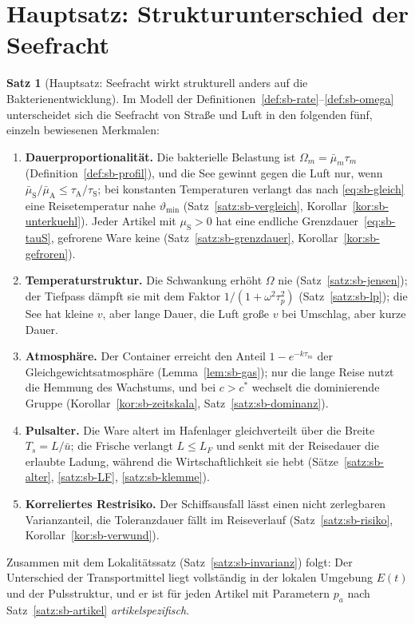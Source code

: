 \documentclass[a4paper, 12pt, twoside, openright]{report}
\theoremstyle{definition}
\theoremstyle{definition}
\newtheorem{satz}{Satz}[chapter]
\begin{document}
\section{Hauptsatz: Strukturunterschied der Seefracht}
\label{sec:sb-haupt}

\begin{satz}[Hauptsatz: Seefracht wirkt strukturell anders auf die Bakterienentwicklung]\label{satz:sb-haupt}
Im Modell der Definitionen~\ref{def:sb-rate}--\ref{def:sb-omega} unterscheidet sich die
Seefracht von Straße und Luft in den folgenden fünf, einzeln bewiesenen Merkmalen:
\begin{enumerate}
  \item \textbf{Dauerproportionalität.} Die bakterielle Belastung ist $\Omega_m=\bar\mu_m\tau_m$
    (Definition~\ref{def:sb-profil}), und die See gewinnt gegen die Luft nur, wenn
    $\bar\mu_{\mathrm S}/\bar\mu_{\mathrm A}\le\tau_{\mathrm A}/\tau_{\mathrm S}$; bei konstanten
    Temperaturen verlangt das nach \eqref{eq:sb-gleich} eine Reisetemperatur nahe $\vartheta_{\min}$
    (Satz~\ref{satz:sb-vergleich}, Korollar~\ref{kor:sb-unterkuehl}). Jeder Artikel mit $\mu_{\mathrm S}>0$
    hat eine endliche Grenzdauer~\eqref{eq:sb-tauS}, gefrorene Ware keine
    (Satz~\ref{satz:sb-grenzdauer}, Korollar~\ref{kor:sb-gefroren}).
  \item \textbf{Temperaturstruktur.} Die Schwankung erhöht $\Omega$ nie (Satz~\ref{satz:sb-jensen});
    der Tiefpass dämpft sie mit dem Faktor $1/(1+\omega^2\tau_p^2)$ (Satz~\ref{satz:sb-lp}); die See
    hat kleine $v$, aber lange Dauer, die Luft große $v$ bei Umschlag, aber kurze Dauer.
  \item \textbf{Atmosphäre.} Der Container erreicht den Anteil $1-e^{-k\tau_m}$ der
    Gleichgewichtsatmosphäre (Lemma~\ref{lem:sb-gas}); nur die lange Reise nutzt die Hemmung
    des Wachstums, und bei $c>c^\ast$ wechselt die dominierende Gruppe
    (Korollar~\ref{kor:sb-zeitskala}, Satz~\ref{satz:sb-dominanz}).
  \item \textbf{Pulsalter.} Die Ware altert im Hafenlager gleichverteilt über die Breite
    $T_s=L/\bar u$; die Frische verlangt $L\le L_F$ und senkt mit der Reisedauer die erlaubte
    Ladung, während die Wirtschaftlichkeit sie hebt (Sätze~\ref{satz:sb-alter}, \ref{satz:sb-LF},
    \ref{satz:sb-klemme}).
  \item \textbf{Korreliertes Restrisiko.} Der Schiffsausfall lässt einen nicht zerlegbaren
    Varianzanteil, die Toleranzdauer fällt im Reiseverlauf (Satz~\ref{satz:sb-risiko},
    Korollar~\ref{kor:sb-verwund}).
\end{enumerate}
Zusammen mit dem Lokalitätssatz (Satz~\ref{satz:sb-invarianz}) folgt: Der Unterschied der
Transportmittel liegt vollständig in der lokalen Umgebung $E(t)$ und der Pulsstruktur, und
er ist für jeden Artikel mit Parametern $p_a$ nach Satz~\ref{satz:sb-artikel} \emph{artikelspezifisch}.
\end{satz}
\end{document}
